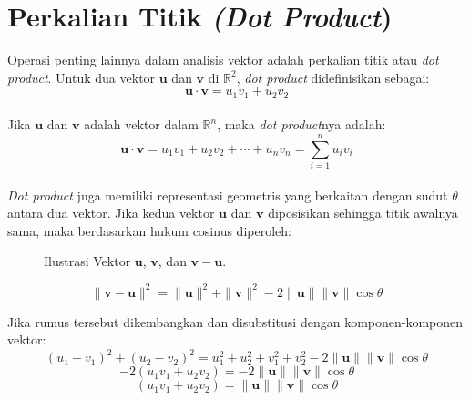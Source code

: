 \documentclass[a4paper,12pt]{report}
\numberwithin{equation}{chapter}
\begin{document}
\section*{Perkalian Titik \textit{(Dot Product})}

Operasi penting lainnya dalam analisis vektor adalah perkalian titik atau \textit{dot product}. Untuk dua vektor $\mathbf{u}$ dan $\mathbf{v}$ di $\mathbb{R}^2$, \textit{dot product} didefinisikan sebagai:
\begin{equation}
   \mathbf{u} \cdot \mathbf{v} = u_1v_1 + u_2v_2 
   \label{eq:dotprodudct}
\end{equation}
\\
Jika $\mathbf{u}$ dan $\mathbf{v}$ adalah vektor dalam $\mathbb{R}^n$, maka \textit{dot product}nya adalah:
\[
\mathbf{u} \cdot \mathbf{v} = u_1v_1 + u_2v_2 + \cdots + u_nv_n = \sum_{i=1}^{n} u_iv_i
\]
\\
\textit{Dot product} juga memiliki representasi geometris yang berkaitan dengan sudut $\theta$ antara dua vektor. Jika kedua vektor $\mathbf{u}$ dan $\mathbf{v}$ diposisikan sehingga titik awalnya sama, maka berdasarkan hukum cosinus diperoleh:


\begin{figure}[h!]
    \centering
    \caption{Ilustrasi Vektor $\mathbf{u}$, $\mathbf{v}$, dan $\mathbf{v} - \mathbf{u}$.}
    \label{fig:Vektor Aturan Segitiga}
\end{figure}

\[
\| \mathbf{v} - \mathbf{u} \|^2 = \| \mathbf{u} \|^2 + \| \mathbf{v} \|^2 - 2 \| \mathbf{u} \| \| \mathbf{v} \| \cos \theta
\]


Jika rumus tersebut dikembangkan dan disubstitusi dengan komponen-komponen vektor:
\[
(u_1 - v_1)^2 + (u_2 - v_2)^2 = u_1^2 + u_2^2 + v_1^2 + v_2^2 - 2 \| \mathbf{u} \| \| \mathbf{v} \| \cos \theta
\]
\[
    -2(u_1 v_1 + u_2 v_2 ) = - 2 \|\mathbf{u}\| \|\mathbf{v}\| \cos{\theta}
\]
\begin{equation}
    (u_1 v_1 + u_2 v_2 ) = \|\mathbf{u}\| \|\mathbf{v}\| \cos{\theta}
    \label{eq:dotprodudct2}
\end{equation}
\end{document}
